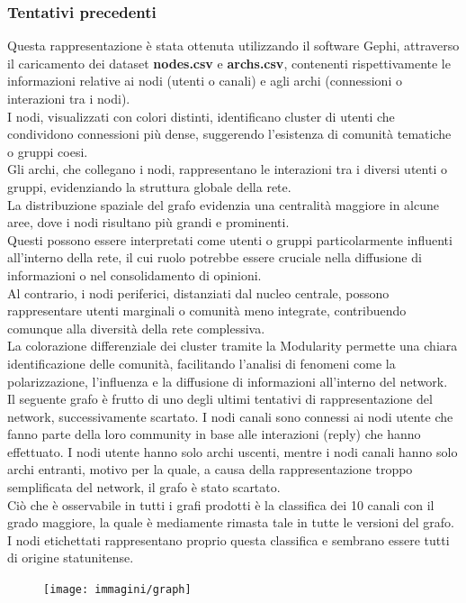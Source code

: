 \documentclass[12pt]{article}
\begin{document}
	\subsubsection{Tentativi precedenti}
	Questa rappresentazione è stata ottenuta utilizzando il software Gephi, attraverso il caricamento dei dataset \textbf{nodes.csv} e \textbf{archs.csv}, contenenti rispettivamente le informazioni relative ai nodi (utenti o canali) e agli archi (connessioni o interazioni tra i nodi). \\I nodi, visualizzati con colori distinti, identificano cluster di utenti che condividono connessioni più dense, suggerendo l'esistenza di comunità tematiche o gruppi coesi. \\Gli archi, che collegano i nodi, rappresentano le interazioni tra i diversi utenti o gruppi, evidenziando la struttura globale della rete.\\
	La distribuzione spaziale del grafo evidenzia una centralità maggiore in alcune aree, dove i nodi risultano più grandi e prominenti.\\ Questi possono essere interpretati come utenti o gruppi particolarmente influenti all'interno della rete, il cui ruolo potrebbe essere cruciale nella diffusione di informazioni o nel consolidamento di opinioni.\\ Al contrario, i nodi periferici, distanziati dal nucleo centrale, possono rappresentare utenti marginali o comunità meno integrate, contribuendo comunque alla diversità della rete complessiva.\\
	La colorazione differenziale dei cluster tramite la Modularity permette una chiara identificazione delle comunità, facilitando l'analisi di fenomeni come la polarizzazione, l'influenza e la diffusione di informazioni all'interno del network.\\
	Il seguente grafo è frutto di uno degli ultimi tentativi di rappresentazione del network, successivamente scartato. I nodi canali sono connessi ai nodi utente che fanno parte della loro community in base alle interazioni (reply) che hanno effettuato. I nodi utente hanno solo archi uscenti, mentre i nodi canali hanno solo archi entranti, motivo per la quale, a causa della rappresentazione troppo semplificata del network, il grafo è stato scartato.\\
	Ciò che è osservabile in tutti i grafi prodotti è la classifica dei 10 canali con il grado maggiore, la quale è mediamente rimasta tale in tutte le versioni del grafo. I nodi etichettati rappresentano proprio questa classifica e sembrano essere tutti di origine statunitense.\\
	\begin{figure}[H]
		\centering
		\texttt{[image: immagini/graph]}
	\end{figure}
\end{document}
